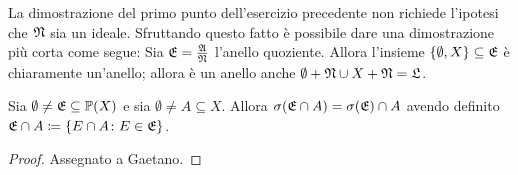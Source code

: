 \documentclass[../EserciziIstituzioniAnalisi.tex]{subfiles}
\begin{document}
\begin{remark}
  La dimostrazione del primo punto dell'esercizio precedente non richiede l'ipotesi che $\mathfrak N$ sia un ideale. Sfruttando questo fatto è possibile dare una dimostrazione più corta come segue:
  Sia $\mathfrak E=\frac{\mathfrak A}{\mathfrak N}$ l'anello quoziente. Allora l'insieme $\{\emptyset, X\}\subseteq\mathfrak E$ è chiaramente un'anello; allora è un anello anche $\emptyset+\mathfrak N \cup X+\mathfrak N=\mathfrak L$.
\end{remark}

\begin{exercise}[2016-10-13]
  Sia $\emptyset \neq \mathfrak E \subseteq \mathbb P(X)$ e sia $\emptyset \neq A \subseteq X$.
Allora $\sigma(\mathfrak E \cap A) = \sigma(\mathfrak E) \cap A$ avendo definito $\mathfrak E \cap A \coloneqq \left\lbrace E \cap A \colon E \in \mathfrak E\right\rbrace$.
\end{exercise}
\begin{proof}
Assegnato a Gaetano.
\end{proof}
\end{document}
